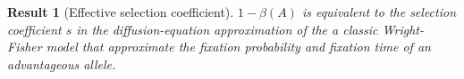 \documentclass[12pt]{extarticle}
\newtheorem{result}{Result}
\begin{document}


\begin{result}[Effective selection coefficient]\label{res:selection_coef}
$1-\beta(A)$ is equivalent to the selection coefficient $s$ in the diffusion-equation approximation of the a classic Wright-Fisher model that approximate the fixation probability and fixation time of an advantageous allele.
\end{result}
\end{document}
